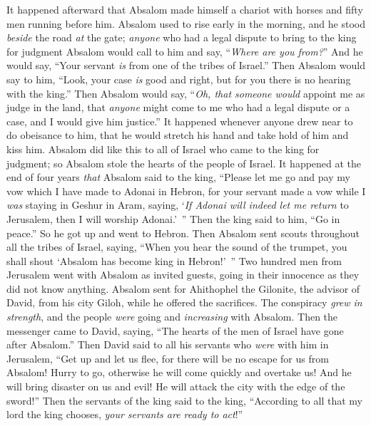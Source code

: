 \begin{biblechapter} %
 It happened afterward that Absalom made himself a chariot with horses and fifty men running before him.
\verse Absalom used to rise early in the morning, and he stood \textit{beside} the road \textit{at} the gate; \textit{anyone} who had a legal dispute to bring to the king for judgment Absalom would call to him and say, “\textit{Where are you from?}” And he would say, “Your servant \textit{is} from one of the tribes of Israel.”
\verse Then Absalom would say to him, “Look, your case \textit{is} good and right, but for you there is no hearing with the king.”
\verse Then Absalom would say, “\textit{Oh, that someone would} appoint me as judge in the land, that \textit{anyone} might come to me who had a legal dispute or a case, and I would give him justice.”
\verse It happened whenever anyone drew near to do obeisance to him, that he would stretch his hand and take hold of him and kiss him.
\verse Absalom did like this to all of Israel who came to the king for judgment; so Absalom stole the hearts of the people of Israel.
\verse It happened at the end of four years \textit{that} Absalom said to the king, “Please let me go and pay my vow which I have made to Adonai in Hebron,
\verse for your servant made a vow while I \textit{was} staying in Geshur in Aram, saying, ‘\textit{If Adonai will indeed let me return} to Jerusalem, then I will worship Adonai.’ ”
\verse Then the king said to him, “Go in peace.” So he got up and went to Hebron.
\verse Then Absalom sent scouts throughout all the tribes of Israel, saying, “When you hear the sound of the trumpet, you shall shout ‘Absalom has become king in Hebron!’ ”
\verse Two hundred men from Jerusalem went with Absalom as invited guests, going in their innocence as they did not know anything.
\verse Absalom sent for Ahithophel the Gilonite, the advisor of David, from his city Giloh, while he offered the sacrifices. The conspiracy \textit{grew in strength}, and the people \textit{were} going and \textit{increasing} with Absalom.
 Then the messenger came to David, saying, “The hearts of the men of Israel have gone after Absalom.”
\verse Then David said to all his servants who \textit{were} with him in Jerusalem, “Get up and let us flee, for there will be no escape for us from Absalom! Hurry to go, otherwise he will come quickly and overtake us! And he will bring disaster on us and evil! He will attack the city with the edge of the sword!”
\verse Then the servants of the king said to the king, “According to all that my lord the king chooses, \textit{your servants are ready to act}!”

\end{biblechapter}
